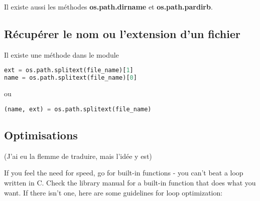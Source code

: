 \documentclass[a4paper,twoside]{article}
\begin{document}
Il existe aussi les méthodes \textbf{os.path.dirname} et \textbf{os.path.pardirb}.

\subsection{Récupérer le nom ou l'extension d'un fichier}
Il existe une méthode dans le module 
\begin{lstlisting}[language=python]
ext = os.path.splitext(file_name)[1]
name = os.path.splitext(file_name)[0]
\end{lstlisting}
ou 
\begin{lstlisting}[language=python]
(name, ext) = os.path.splitext(file_name)
\end{lstlisting}



\subsection{Optimisations}
(J'ai eu la flemme de traduire, mais l'idée y est)

If you feel the need for speed, go for built-in functions - you can't beat a loop written in C. Check the library manual for a built-in function that does what you want. If there isn't one, here are some guidelines for loop optimization:
\end{document}
